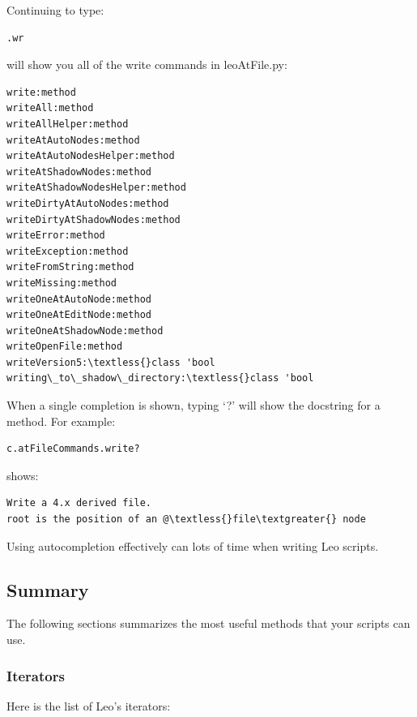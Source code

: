 \documentclass[a4paper,10pt,english]{sphinxmanual}
\begin{document}
Continuing to type:

\begin{Verbatim}[commandchars=\\\{\}]
.wr
\end{Verbatim}

will show you all of the write commands in leoAtFile.py:

\begin{Verbatim}[commandchars=\\\{\}]
write:method
writeAll:method
writeAllHelper:method
writeAtAutoNodes:method
writeAtAutoNodesHelper:method
writeAtShadowNodes:method
writeAtShadowNodesHelper:method
writeDirtyAtAutoNodes:method
writeDirtyAtShadowNodes:method
writeError:method
writeException:method
writeFromString:method
writeMissing:method
writeOneAtAutoNode:method
writeOneAtEditNode:method
writeOneAtShadowNode:method
writeOpenFile:method
writeVersion5:\textless{}class 'bool
writing\_to\_shadow\_directory:\textless{}class 'bool
\end{Verbatim}

When a single completion is shown, typing `?' will show the docstring for a method.
For example:

\begin{Verbatim}[commandchars=\\\{\}]
c.atFileCommands.write?
\end{Verbatim}

shows:

\begin{Verbatim}[commandchars=\\\{\}]
Write a 4.x derived file.
root is the position of an @\textless{}file\textgreater{} node
\end{Verbatim}

Using autocompletion effectively can lots of time when writing Leo scripts.


\subsection{Summary}
\label{scripting:summary}
The following sections summarizes the most useful methods that your
scripts can use.


\subsubsection{Iterators}
\label{scripting:iterators}
Here is the list of Leo's iterators:
\end{document}
